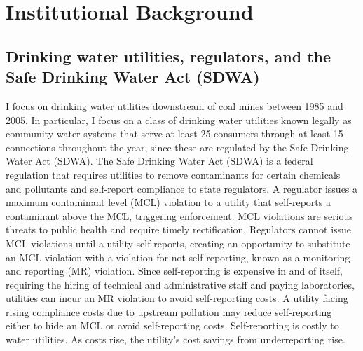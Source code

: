 \documentclass{article}
\begin{document}

\section{Institutional Background}

\subsection{Drinking water utilities, regulators, and the Safe Drinking Water Act (SDWA)}

I focus on drinking water utilities downstream of coal mines between 1985 and 2005. In particular, I focus on a class of drinking water utilities known legally as community water systems that serve at least 25 consumers through at least 15 connections throughout the year, since these are regulated by the Safe Drinking Water Act (SDWA). The Safe Drinking Water Act (SDWA) is a federal regulation that requires utilities to remove contaminants for certain chemicals and pollutants and self-report compliance to state regulators. A regulator issues a maximum contaminant level (MCL) violation to a utility that self-reports a contaminant above the MCL, triggering enforcement. MCL violations are serious threats to public health and require timely rectification. Regulators cannot issue MCL violations until a utility self-reports, creating an opportunity to substitute an MCL violation with a violation for not self-reporting, known as a monitoring and reporting (MR) violation. Since self-reporting is expensive in and of itself, requiring the hiring of technical and administrative staff and paying laboratories, utilities can incur an MR violation to avoid self-reporting costs. A utility facing rising compliance costs due to upstream pollution may reduce self-reporting either to hide an MCL or avoid self-reporting costs. Self-reporting is costly to water utilities. As costs rise, the utility's cost savings from underreporting rise.
\end{document}
